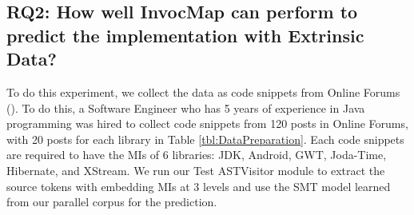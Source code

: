 \subsection{RQ2: How well InvocMap can perform to predict the implementation with Extrinsic Data?}

To do this experiment, we collect the data as code snippets from Online Forums (\cite{id:StackOverflow,id:ProgramCreek,id:GeeksForGeeks}). To do this, a Software Engineer who has 5 years of experience in Java programming was hired to collect code snippets from 120 posts in Online Forums, with 20 posts for each library in Table \ref{tbl:DataPreparation}. Each code snippets are required to have the MIs of 6 libraries: JDK, Android, GWT, Joda-Time, Hibernate, and XStream. We run our Test ASTVisitor module to extract the source tokens with embedding MIs at 3 levels and use the SMT model learned from our parallel corpus for the prediction.


